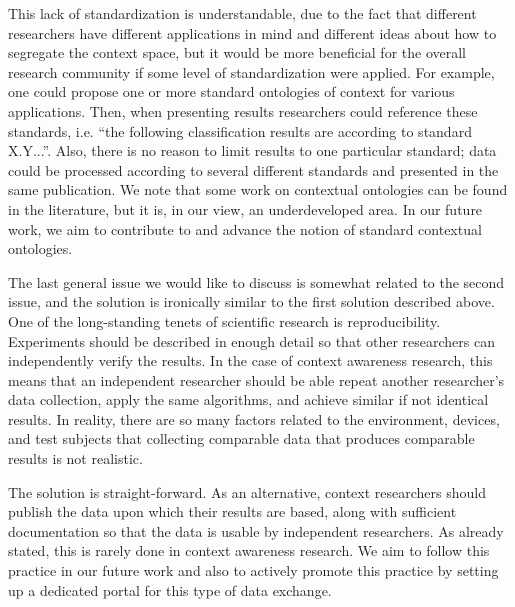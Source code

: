 This lack of standardization is understandable, due to the fact that different researchers have different applications in mind and different ideas about how to segregate the context space, but it would be more beneficial for the overall research community if some level of standardization were applied. For example, one could propose one or more standard ontologies of context for various applications. Then, when presenting results researchers could reference these standards, i.e. ``the following classification results are according to standard X.Y...''. Also, there is no reason to limit results to one particular standard; data could be processed according to several different standards and presented in the same publication. We note that some work on contextual ontologies can be found in the literature, %
 but it is, in our view, an underdeveloped area. In our future work, we aim to contribute to and advance the notion of standard contextual ontologies.

The last general issue we would like to discuss is somewhat related to the second issue, and the solution is ironically similar to the first solution described above. One of the long-standing tenets of scientific research is reproducibility. Experiments should be described in enough detail so that other researchers can independently verify the results. In the case of context awareness research, this means that an independent researcher should be able repeat another researcher's data collection, apply the same algorithms, and achieve similar if not identical results. In reality, there are so many factors related to the environment, devices, and test subjects that collecting comparable data that produces comparable results is not realistic.

The solution is straight-forward. As an alternative, context researchers should publish the data upon which their results are based, along with sufficient documentation so that the data is usable by independent researchers. As already stated, this is rarely done in context awareness research. We aim to follow this practice in our future work and also to actively promote this practice by setting up a dedicated portal for this type of data exchange.